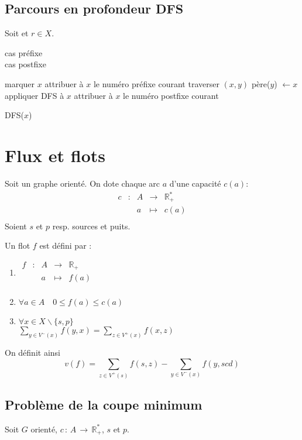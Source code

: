 \documentclass[a4paper, 8pt]{article}
\begin{document}
\begin{multicols*}{3}
\subsection*{Parcours en profondeur DFS}

Soit \GXA et $r\in X$.
\begin{flushright}
{\footnotesize
{\color{blue} cas préfixe} \\
{\color{red} cas postfixe}
}
\end{flushright}
\begin{algorithm}[H]
marquer $x$\;
{\color{blue} attribuer à $x$ le numéro préfixe courant}\;
{
	traverser $(x,y)$\;
	{
		père($y$) $\longleftarrow x$\;
		appliquer DFS à $x$\;
	}
}
{\color{red} attribuer à $x$ le numéro postfixe courant}\;
\caption{DFS($x$)}
\end{algorithm}

\section*{Flux et flots}

Soit \GXA un graphe orienté. On dote chaque arc $a$ d'une capacité $c(a)$:
\[
\begin{array}{cc|ccl}
c & : & A & \to & \mathbb{R}^*_+  \\
 & & a & \mapsto & c(a) \\
\end{array}
\]
Soient $s$ et $p$ resp. sources et puits.

Un flot $f$ est défini par : \begin{enumerate}
\item $
\begin{array}{cc|ccl} 
f & : & A & \to & \mathbb{R}_+  \\
 & & a & \mapsto & f(a)\\
\end{array}
$
\item $\forall a \in A\quad 0 \leqslant f(a) \leqslant c(a) $
\item $ \forall x \in X\backslash\{s,p\}$\\ 
 $\displaystyle\sum_{y\in V^-(x)}{f(y,x)} = \sum_{z\in V^+(x)}{f(x,z)} $
\end{enumerate}

On définit ainsi
\[v(f) = \displaystyle\sum_{z\in V^+(s)}{f(s,z)} - \sum_{y\in V^-(x)}{f(y,scd)} \]

\subsection*{Problème de la coupe minimum}
Soit $G$ orienté, $c\, :\, A\, \rightarrow\, \mathbb{R}^*_+$, $s$ et $p$.


\end{multicols*}
\end{document}
